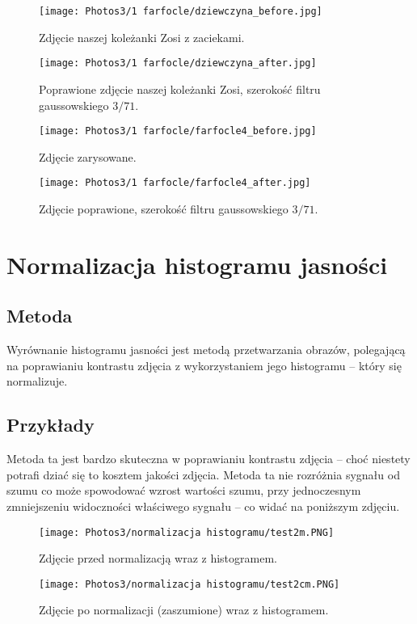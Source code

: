 \documentclass[]{mwart}
\begin{document}
\begin{figure}[H]
    \centering
    \texttt{[image: Photos3/1 farfocle/dziewczyna\_before.jpg]}
    \caption{Zdjęcie naszej koleżanki Zosi z zaciekami.}
\end{figure}
\begin{figure}[H]
    \centering
    \texttt{[image: Photos3/1 farfocle/dziewczyna\_after.jpg]}
    \caption{Poprawione zdjęcie naszej koleżanki Zosi, szerokość filtru gaussowskiego $3/71$.}
\end{figure}

\begin{figure}[H]
    \centering
    \texttt{[image: Photos3/1 farfocle/farfocle4\_before.jpg]}
    \caption{Zdjęcie zarysowane.}
\end{figure}
\begin{figure}[H]
    \centering
    \texttt{[image: Photos3/1 farfocle/farfocle4\_after.jpg]}
    \caption{Zdjęcie poprawione, szerokość filtru gaussowskiego $3/71$.}
\end{figure}






\section{Normalizacja histogramu jasności       }
\subsection{Metoda}
Wyrównanie histogramu jasności jest metodą przetwarzania obrazów, polegającą na
poprawianiu kontrastu zdjęcia z wykorzystaniem jego histogramu -- który się normalizuje.

\subsection{Przykłady}
Metoda ta jest bardzo skuteczna w poprawianiu kontrastu zdjęcia -- choć niestety potrafi dziać się
to kosztem jakości zdjęcia. Metoda ta nie rozróżnia sygnału od szumu co może spowodować wzrost wartości szumu,
przy jednoczesnym zmniejszeniu widoczności właściwego sygnału -- co widać na poniższym zdjęciu.

\begin{figure}[H]
    \centering
    \texttt{[image: Photos3/normalizacja histogramu/test2m.PNG]}
    \caption{Zdjęcie przed normalizacją wraz z histogramem.}
\end{figure}
\begin{figure}[H]
    \centering
    \texttt{[image: Photos3/normalizacja histogramu/test2cm.PNG]}
    \caption{Zdjęcie po normalizacji (zaszumione) wraz z histogramem.}
\end{figure}
\end{document}
